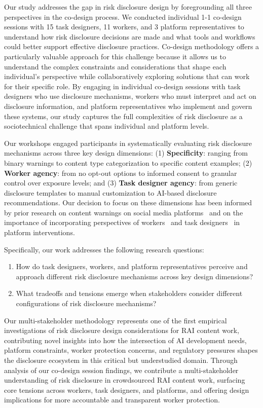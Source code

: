 Our study addresses the gap in risk disclosure design by foregrounding all three perspectives in the co-design process. We conducted individual 1-1 co-design sessions with 15 task designers, 11 workers, and 3 platform representatives to understand how risk disclosure decisions are made and what tools and workflows could better support effective disclosure practices. Co-design methodology offers a particularly valuable approach for this challenge because it allows us to understand the complex constraints and considerations that shape each individual's perspective while collaboratively exploring solutions that can work for their specific role. By engaging in individual co-design sessions with task designers who use disclosure mechanisms, workers who must interpret and act on disclosure information, and platform representatives who implement and govern these systems, our study captures the full complexities of risk disclosure as a sociotechnical challenge that spans individual and platform levels. 

Our workshops engaged participants in systematically evaluating risk disclosure mechanisms across three key design dimensions: (1) \textbf{Specificity}: ranging from binary warnings to content type categorization to specific content examples; (2) \textbf{Worker agency}: from no opt-out options to informed consent to granular control over exposure levels; and (3) \textbf{Task designer agency}: from generic disclosure templates to manual customization to AI-based disclosure recommendations. Our decision to focus on these dimensions has been informed by prior research on content warnings on social media platforms~\cite {Zhang2024PerceptionsTriggerWarnings, vit2025use} and on the importance of incorporating perspectives of workers~\cite{salehi2018ink,salehi2015we} and task designers~\cite{qian2025locating, gutheim2012fantasktic, bragg2018sprout} in platform interventions. 


Specifically, our work addresses the following research questions:
\begin{enumerate}
  \item How do task designers, workers, and platform representatives perceive and approach different risk disclosure mechanisms across key design dimensions? 
  \item What tradeoffs and tensions emerge when stakeholders consider different configurations of risk disclosure mechanisms?  
\end{enumerate}

Our multi-stakeholder methodology represents one of the first empirical investigations of risk disclosure design considerations for RAI content work, contributing novel insights into how the intersection of AI development needs, platform constraints, worker protection concerns, and regulatory pressures shapes the disclosure ecosystem in this critical but understudied domain. Through analysis of our co-design session findings, we contribute a multi-stakeholder understanding of risk disclosure in crowdsourced RAI content work, surfacing core tensions across workers, task designers, and platforms, and offering design implications for more accountable and transparent worker protection.


